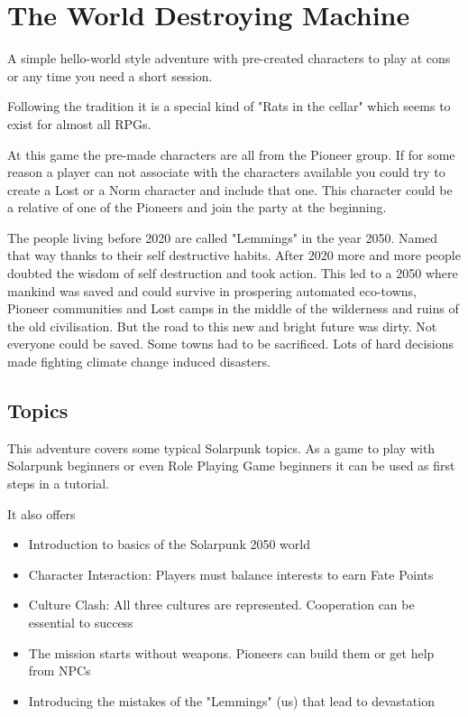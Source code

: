 \chapter{The World Destroying Machine}
\label{ch:the world destroying machine}

A simple hello-world style adventure with pre-created characters to play at cons or any time you need a short session.

Following the tradition it is a special kind of "Rats in the cellar" which seems to exist for almost all RPGs.

At this game the pre-made characters are all from the Pioneer group. If for some reason a player can not associate with the characters available you could try to create a Lost or a Norm character and include that one. This character could be a relative of one of the Pioneers and join the party at the beginning.

\begin{sidebarBox}[title=Dirty Road to Eden]

The people living before 2020 are called "Lemmings" in the year 2050. Named that way thanks to their self destructive habits. After 2020 more and more people doubted the wisdom of self destruction and took action. This led to a 2050 where mankind was saved and could survive in prospering automated eco-towns, Pioneer communities and Lost camps in the middle of the wilderness and ruins of the old civilisation. But the road to this new and bright future was dirty. Not everyone could be saved. Some towns had to be sacrificed. Lots of hard decisions made fighting climate change induced disasters. 

\end{sidebarBox}

\section{Topics}

This adventure covers some typical Solarpunk topics. As a game to play with Solarpunk beginners or even Role Playing Game beginners it can be used as first steps in a tutorial.

It also offers

\begin{itemize}
\item Introduction to basics of the Solarpunk 2050 world
\item Character Interaction: Players must balance interests to earn Fate Points
\item Culture Clash: All three cultures are represented. Cooperation can be essential to success
\item The mission starts without weapons. Pioneers can build them or get help from NPCs
\item Introducing the mistakes of the "Lemmings" (us) that lead to devastation
\end{itemize}

